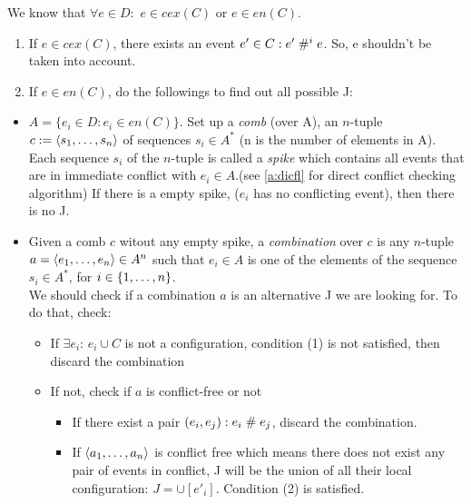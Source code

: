\documentclass{llncs}
\begin{document}
\noindent
We know that $\forall e \in D: $ $e \in cex(C)$ or $e \in en(C)$.
\begin{enumerate}
\item
	If  $e \in cex(C)$, there exists an event $e' \in C: e' \mathrel{\#^i_{}} e$. So, e shouldn't be taken into account.
\item
	If $e \in en(C)$, do the followings to find out all possible J:
\end{enumerate}

\begin{itemize}
\item 
	$A = \{e_i \in D: e_i \in en(C)\}$.
	Set up a \emph{comb} (over A),
	an $n$-tuple $c \mathrel{:=} \langle s_1, \ldots, s_n\rangle$ of sequences $s_i \in A^*$
	(n is the number of elements in A).
	Each sequence $s_i$ of the $n$-tuple is called a \emph{spike} 
	which contains all events that are in immediate conflict with $e_{i} \in A$.(see \ref{a:dicfl} for direct conflict checking algorithm)
	If there is a empty spike, ($e_i$ has no conflicting event), then there is no J.
\item
	Given a comb $c$ witout any empty spike, a \emph{combination} over $c$ is any $n$-tuple $a = \langle e_1, \ldots, e_n\rangle \in A^n$ such that $e_i \in A$ is one of the elements of the sequence $s_i \in A^*$, for $i \in {\{ 1, \ldots, n \mathclose \}}$. \\
	We should check if a combination $a$ is an alternative J we are looking for. To do that, check:
	
\begin{itemize}
	\item
		If $\exists e_i$: $e_i \cup C$ is not a configuration, condition (1) is not satisfied, 
		then discard the combination
	\item
		If not, check if $a$ is conflict-free or not
		\begin{itemize}
			\item
				If there exist a pair $(e_i, e_j): e_i \mathrel{\#} e_j$, discard the combination.
			\item
				If $\langle a_1, \ldots, a_n\rangle$ is conflict free which means there does not exist any pair 
				of events in conflict, J will be the union of all their local configuration:
				$ J = \cup [e'_i]$. Condition (2) is satisfied.
		\end{itemize}
\end{itemize}
\end{itemize}
\end{document}
